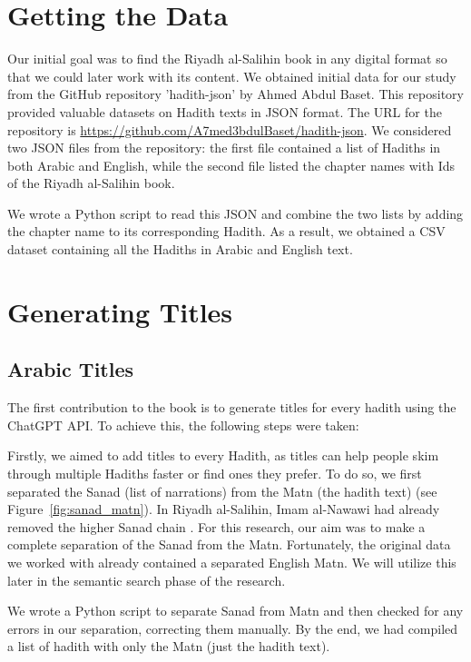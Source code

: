\section{ Getting the Data}

Our initial goal was to find the Riyadh al-Salihin book in any digital format so that we could later work with its content. We obtained initial data for our study from the GitHub repository 'hadith-json' by Ahmed Abdul Baset. This repository provided valuable datasets on Hadith texts in JSON format. The URL for the repository is \url{https://github.com/A7med3bdulBaset/hadith-json}. We considered two JSON files from the repository: the first file contained a list of Hadiths in both Arabic and English, while the second file listed the chapter names with Ids of the Riyadh al-Salihin book.

We wrote a Python script to read this JSON and combine the two lists by adding the chapter name to its corresponding Hadith. As a result, we obtained a CSV dataset containing all the Hadiths in Arabic and English text.

\section{Generating Titles}

\subsection{Arabic Titles}

The first contribution to the book is to generate titles for every hadith using the ChatGPT API. To achieve this, the following steps were taken:

Firstly, we aimed to add titles to every Hadith, as titles can help people skim through multiple Hadiths faster or find ones they prefer. To do so, we first separated the Sanad (list of narrations) from the Matn (the hadith text) (see Figure~\ref{fig:sanad_matn}). In Riyadh al-Salihin, Imam al-Nawawi had already removed the higher Sanad chain \cite{site1}. For this research, our aim was to make a complete separation of the Sanad from the Matn. Fortunately, the original data we worked with already contained a separated English Matn. We will utilize this later in the semantic search phase of the research.

We wrote a Python script to separate Sanad from Matn and then checked for any errors in our separation, correcting them manually. By the end, we had compiled a list of hadith with only the Matn (just the hadith text).

